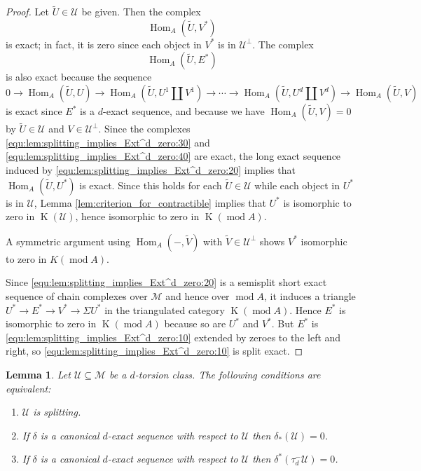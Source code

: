 \documentclass[12pt,reqno]{amsart}
\def\cM{\mathscr{M}}
\def\cU{\mathscr{U}}
\def\Hom{\operatorname{Hom}}
\def\K{\operatorname{K}}
\def\mod{\operatorname{mod}}
\numberwithin{equation}{section}
\newtheorem{Lemma}{Lemma}[section]
\theoremstyle{definition}
\theoremstyle{theorem}
\theoremstyle{definition}
\begin{document}
\begin{proof}
Let $\widetilde{ U } \in \cU$ be given.  Then the complex
\begin{equation}
\label{equ:lem:splitting_implies_Ext^d_zero:30}
  \Hom_A( \widetilde{ U },V^* )
\end{equation}
is exact; in fact, it is zero since each object in $V^*$ is in $\cU^{ \perp }$.  The complex
\begin{equation}
\label{equ:lem:splitting_implies_Ext^d_zero:40}
  \Hom_A( \widetilde{ U },E^* )
\end{equation}
is also exact because the sequence
\[
  0
  \xrightarrow{} \Hom_A( \widetilde{ U },U )
  \xrightarrow{} \Hom_A( \widetilde{ U },U^1 \coprod V^1 )
  \xrightarrow{} \cdots
  \xrightarrow{} \Hom_A( \widetilde{ U },U^d \coprod V^d )
  \xrightarrow{} \Hom_A( \widetilde{ U },V )  
\]
is exact since $E^*$ is a $d$-exact sequence, and because we have $\Hom_A( \widetilde{ U },V ) = 0$ by $\widetilde{ U } \in \cU$ and $V \in \cU^{ \perp }$.  Since the complexes \eqref{equ:lem:splitting_implies_Ext^d_zero:30} and \eqref{equ:lem:splitting_implies_Ext^d_zero:40} are exact, the long exact sequence induced by \eqref{equ:lem:splitting_implies_Ext^d_zero:20} implies that $\Hom_A( \widetilde{ U },U^* )$ is exact.  Since this holds for each $\widetilde{ U } \in \cU$ while each object in $U^*$ is in $\cU$, Lemma \ref{lem:criterion_for_contractible} implies that $U^*$ is isomorphic to zero in $\K( \cU )$, hence isomorphic to zero in $\K( \mod A )$.

A symmetric argument using $\Hom_A( -,\widetilde{ V } )$ with $\widetilde{ V } \in \cU^{ \perp }$ shows $V^*$ isomorphic to zero in $K( \mod A )$.

Since \eqref{equ:lem:splitting_implies_Ext^d_zero:20} is a semisplit short exact sequence of chain complexes over $\cM$ and hence over $\mod A$, it induces a triangle $U^* \xrightarrow{} E^* \xrightarrow{} V^* \xrightarrow{} \Sigma U^*$ in the triangulated category $\K( \mod A )$.  Hence $E^*$ is isomorphic to zero in $\K( \mod A )$ because so are $U^*$ and $V^*$.  But $E^*$ is \eqref{equ:lem:splitting_implies_Ext^d_zero:10} extended by zeroes to the left and right, so \eqref{equ:lem:splitting_implies_Ext^d_zero:10} is split exact.
\end{proof}


\begin{Lemma}
\label{lem:splitting_vs_defects}
Let $\cU \subseteq \cM$ be a $d$-torsion class.  The following conditions are equivalent:
\begin{enumerate}
\setlength\itemsep{4pt}

  \item  $\cU$ is splitting.
  
  \item  If $\delta$ is a canonical $d$-exact sequence with respect to $\cU$ then $\delta_*( \cU ) = 0$.

  \item  If $\delta$ is a canonical $d$-exact sequence with respect to $\cU$ then $\delta^*( \tau_d^-\cU ) = 0$.

\end{enumerate}
\end{Lemma}
\end{document}
